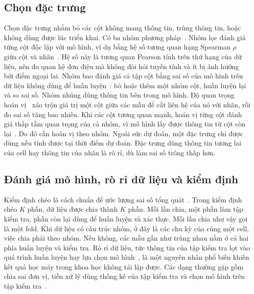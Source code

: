 \subsection{Chọn đặc trưng}\label{sec:lt_chon}

Chọn đặc trưng nhằm bỏ các cột không mang thông tin, trùng thông tin, hoặc không dùng được lúc triển khai. Có ba nhóm
phương pháp~\cite{guyon2003}. Nhóm lọc đánh giá từng cột độc lập với mô hình, ví dụ bằng hệ số tương quan hạng Spearman
$\rho$ giữa cột và nhãn~\cite{spearman1904}. Hệ số này là tương quan Pearson tính trên thứ hạng của dữ liệu, nên đo quan
hệ đơn điệu mà không đòi hỏi tuyến tính và ít bị ảnh hưởng bởi điểm ngoại lai. Nhóm bao đánh giá cả tập cột bằng sai số
của mô hình trên dữ liệu không dùng để huấn luyện~\cite{kohavi1997}: bỏ hoặc thêm một nhóm cột, huấn luyện lại và so sai
số. Nhóm nhúng dùng thông tin bên trong mô hình. Độ quan trọng hoán vị~\cite{breiman2001rf} xáo trộn giá trị một cột
giữa các mẫu để cắt liên hệ của nó với nhãn, rồi đo sai số tăng bao nhiêu. Khi các cột tương quan mạnh, hoán vị từng cột
đánh giá thấp tầm quan trọng của cả nhóm, vì mô hình lấy được thông tin từ cột còn lại~\cite{strobl2008}. Do đó cần hoán
vị theo nhóm. Ngoài sức dự đoán, một đặc trưng chỉ được dùng nếu tính được tại thời điểm dự đoán. Đặc trưng dùng thông
tin tương lai của cell hay thông tin của nhãn là rò rỉ, dù làm sai số trông thấp hơn.

\subsection{Đánh giá mô hình, rò rỉ dữ liệu và kiểm định}\label{sec:lt_danhgia}

Kiểm định chéo là cách chuẩn để ước lượng sai số tổng quát~\cite{arlot2010}. Trong kiểm định chéo $K$ phần, dữ liệu được
chia thành $K$ phần. Mỗi lần chia, một phần làm tập kiểm tra, phần còn lại dùng để huấn luyện và xác thực. Mỗi lần chia
như vậy gọi là một fold. Khi dữ liệu có cấu trúc nhóm, ở đây là các chu kỳ của cùng một cell, việc chia phải theo nhóm.
Nếu không, các mẫu gần như trùng nhau nằm ở cả hai phía huấn luyện và kiểm tra. Rò rỉ dữ liệu, tức thông tin của tập kiểm
tra lọt vào quá trình huấn luyện hay lựa chọn mô hình~\cite{kaufman2012}, là một nguyên nhân phổ biến khiến kết quả học
máy trong khoa học không tái lập được. Các dạng thường gặp gồm chia sai đơn vị, tiền xử lý dùng thống kê của tập kiểm tra
và chọn mô hình trên tập kiểm tra~\cite{kapoor2023,varma2006}.


